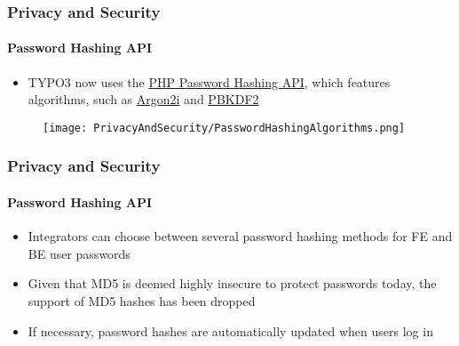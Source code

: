 
\begin{frame}[fragile]
	\frametitle{Privacy and Security}
	\framesubtitle{Password Hashing API}

	\begin{itemize}
		\item TYPO3 now uses the
			\href{https://secure.php.net/manual/en/ref.password.php}{PHP Password Hashing API},
			which features algorithms, such as
			\href{https://en.wikipedia.org/wiki/Argon2}{Argon2i}
			and
			\href{https://en.wikipedia.org/wiki/PBKDF2}{PBKDF2}
	\end{itemize}

	\begin{figure}
		\texttt{[image: PrivacyAndSecurity/PasswordHashingAlgorithms.png]}
	\end{figure}

\end{frame}


\begin{frame}[fragile]
	\frametitle{Privacy and Security}
	\framesubtitle{Password Hashing API}

	\begin{itemize}
		\item Integrators can choose between several password hashing methods
			for FE and BE user passwords
		\item Given that MD5 is deemed highly insecure to protect passwords
			today, the support of MD5 hashes has been dropped
		\item If necessary, password hashes are automatically updated when users
			log in
	\end{itemize}

\end{frame}

